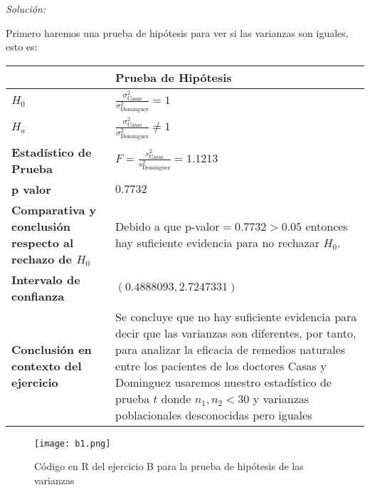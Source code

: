 \documentclass[12pt]{article}
\newenvironment{sol}
    {\emph{Solución:}
    }
    {
    }
\begin{document}
\begin{sol}
Primero haremos una prueba de hipótesis para ver si las varianzas son iguales, esto es:

\begin{table}[h!]
\centering
\begin{tabular}{|>{\raggedright\arraybackslash}m{6cm}|>{\raggedright\arraybackslash}m{6cm}|}
\hline
 & \textbf{Prueba de Hipótesis} \\ \hline
$H_0$ & \vspace{0.5cm}$\frac{\sigma_{\text{Casas}}^2}{\sigma_{\text{Dominguez}
}^2}=1$ \vspace{0.5cm}\\ \hline
$H_a$ & \vspace{0.5cm} $\frac{\sigma_{\text{Casas}}^2}{\sigma_{\text{Dominguez}
}^2}\neq1$ \vspace{0.5cm}\\ \hline
\textbf{Estadístico de Prueba} & \vspace{0.5cm}$F = \frac{s_\text{Casas}^2}{s_\text{Dominguez}^2}=1.1213$\vspace{0.5cm} \\ \hline
\textbf{p valor} & $0.7732$ \\ \hline
\textbf{Comparativa y conclusión respecto al rechazo de $H_0$} & Debido a que p-valor$=0.7732>0.05$ entonces hay suficiente evidencia para no rechazar $H_0$. \\ \hline
\textbf{Intervalo de confianza} & $(0.4888093,2.7247331)$ \\ \hline
\textbf{Conclusión en contexto del ejercicio} & Se concluye que no hay suficiente evidencia para decir que las varianzas son diferentes, por tanto, para analizar la eficacia de remedios naturales entre los pacientes de los doctores Casas y Dominguez usaremos nuestro estadístico de prueba $t$ donde $n_1 ,n_2 < 30$ y varianzas poblacionales desconocidas pero iguales \\ \hline
\end{tabular}
\label{tab:hipotesis}
\end{table}
\pagebreak

\begin{figure}[h]  %
    \centering      %
    \texttt{[image: b1.png]} 
    \caption{Código en R del ejercicio B para la prueba de hipótesis de las varianzas}
\end{figure}


\end{sol}
\end{document}
